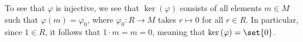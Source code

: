 \documentclass[10pt]{mypackage}
\begin{document}
\begin{solution}
\begin{enumerate}[(a)]
      To see that $\varphi$ is injective, we see that $\ker\left( \varphi \right)$ consists of all elements $m\in M$ such that $\varphi(m) = \varphi_0$, where $\varphi_0\colon R\rightarrow M$ takes $r\mapsto 0$ for all $r\in R$. In particular, since $1\in R$, it follows that $1\cdot m = m = 0$, meaning that $\ker\left( \varphi \right) = \set{0}$.\newline


  \end{enumerate}
\end{solution}
\end{document}
